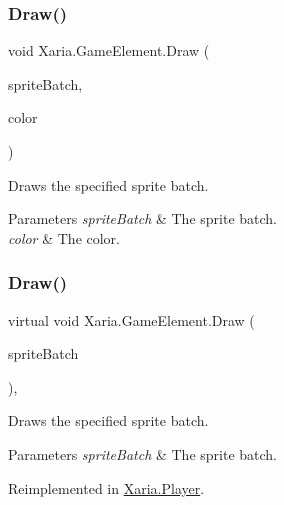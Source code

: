 \subsubsection{\texorpdfstring{Draw()}{Draw()}\hspace{0.1cm}{\footnotesize\ttfamily [1/2]}}
{\footnotesize\ttfamily void Xaria.\+Game\+Element.\+Draw (\begin{DoxyParamCaption}\item[{ref Sprite\+Batch}]{sprite\+Batch,  }\item[{Color}]{color }\end{DoxyParamCaption})\hspace{0.3cm}{\ttfamily [inline]}}



Draws the specified sprite batch. 


\begin{DoxyParams}{Parameters}
{\em sprite\+Batch} & The sprite batch.\\
\hline
{\em color} & The color.\\
\hline
\end{DoxyParams}
\mbox{\label{classXaria_1_1GameElement_a812e0ffbe54519a3fb14a49115bf43d9}} 
\subsubsection{\texorpdfstring{Draw()}{Draw()}\hspace{0.1cm}{\footnotesize\ttfamily [2/2]}}
{\footnotesize\ttfamily virtual void Xaria.\+Game\+Element.\+Draw (\begin{DoxyParamCaption}\item[{ref Sprite\+Batch}]{sprite\+Batch }\end{DoxyParamCaption})\hspace{0.3cm}{\ttfamily [inline]}, {\ttfamily [virtual]}}



Draws the specified sprite batch. 


\begin{DoxyParams}{Parameters}
{\em sprite\+Batch} & The sprite batch.\\
\hline
\end{DoxyParams}


Reimplemented in \hyperlink{classXaria_1_1Player_a25ddea2b9d8679ab6aa649fda6ce1f22}{Xaria.\+Player}.



